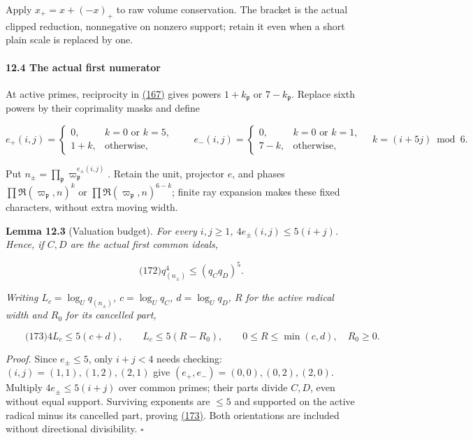 Apply \(x_+=x+(-x)_+\) to raw volume conservation. The bracket is the actual clipped reduction, nonnegative on nonzero support; retain it even when a short plain scale is replaced by one.

\hypertarget{ma:numerator}{}

\label{ma:numerator}

\hypertarget{the-actual-first-numerator}{%
\paragraph{12.4 The actual first numerator}\label{the-actual-first-numerator}}

At active primes, reciprocity in \protect\hyperlink{ma:first-columns}{(167)} gives powers \(1+k_{\mathfrak p}\) or \(7-k_{\mathfrak p}\). Replace sixth powers by their coprimality masks and define

\[
e_+(i,j)=
 \begin{cases}0,&k=0\text{ or }k=5,\\1+k,&\text{otherwise},\end{cases}
 \qquad
 e_-(i,j)=
 \begin{cases}0,&k=0\text{ or }k=1,\\7-k,&\text{otherwise},\end{cases}
 \quad k=(i+5j)\bmod6.
\]

Put \(n_\pm=\prod_{\mathfrak p}\varpi_{\mathfrak p}^{e_\pm(i,j)}\). Retain the unit, projector \(e\), and phases \(\prod\mathfrak R(\varpi_{\mathfrak p},n)^k\) or \(\prod\mathfrak R(\varpi_{\mathfrak p},n)^{6-k}\); finite ray expansion makes these fixed characters, without extra moving width.

\textbf{Lemma 12.3} (Valuation budget). \emph{\hypertarget{ma:valuation}{}\label{ma:valuation} For every \(i,j\ge1\), \(4e_\pm(i,j)\le5(i+j)\). Hence, if \(C,D\) are the actual first common ideals, \hypertarget{ma:numerator-budget}{}\label{ma:numerator-budget}}

\[
\qquad\text{(172)}
 q_{(n_\pm)}^4\le(q_Cq_D)^5.
\]

\emph{Writing \(L_c=\log_Uq_{(n_\pm)}\), \(c=\log_Uq_C\), \(d=\log_Uq_D\), \(R\) for the active radical width and \(R_0\) for its cancelled part, \hypertarget{ma:coupled-gates}{}\label{ma:coupled-gates}}

\[
\qquad\text{(173)}
 4L_c\le5(c+d),\qquad L_c\le5(R-R_0),\qquad
 0\le R\le\min(c,d),\quad R_0\ge0.
\]

\emph{Proof.} Since \(e_\pm\le5\), only \(i+j<4\) needs checking: \((i,j)=(1,1),(1,2),(2,1)\) give \((e_+,e_-)=(0,0),(0,2),(2,0)\). Multiply \(4e_\pm\le5(i+j)\) over common primes; their parts divide \(C,D\), even without equal support. Surviving exponents are \(\le5\) and supported on the active radical minus its cancelled part, proving \protect\hyperlink{ma:coupled-gates}{(173)}. Both orientations are included without directional divisibility. \(\square\)


